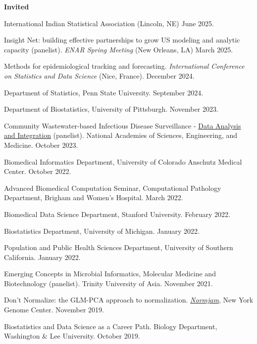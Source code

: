 \documentclass[10pt]{article}
\renewcommand{\section}[2]%
        {\pagebreak[2]\vspace{1.3\baselineskip}%
         \phantomsection\addcontentsline{toc}{section}{#1}%
         \hspace{0in}%
         \marginpar{
         \raggedright \scshape #1}#2}
\begin{document}
\section{Talks}
\textbf{Invited}
\begin{enumerate}[label= {[\arabic*]}]
\item International Indian Statistical Association (Lincoln, NE) June 2025.
\item Insight Net: building effective partnerships to grow US modeling and analytic capacity (panelist). {\it ENAR Spring Meeting} (New Orleans, LA) March 2025.
\item Methods for epidemiological tracking and forecasting. {\it International Conference on Statistics and Data Science} (Nice, France). December 2024. 
\item Department of Statistics, Penn State University. September 2024.
\item Department of Biostatistics, University of Pittsburgh. November 2023.
\item Community Wastewater-based Infectious Disease Surveillance - \href{https://www.nationalacademies.org/event/40901_10-2023_community-wastewater-based-infectious-disease-surveillance-data-analysis-and-integration-open-subgroup-meeting-1}{Data Analysis and Integration} (panelist). National Academies of Sciences, Engineering, and Medicine. October 2023.
\item Biomedical Informatics Department, University of Colorado Anschutz Medical Center. October 2022.
\item Advanced Biomedical Computation Seminar, Computational Pathology Department, Brigham and Women's Hospital. March 2022.
\item Biomedical Data Science Department, Stanford University. February 2022.
\item Biostatistics Department, University of Michigan. January 2022.
\item Population and Public Health Sciences Department, University of Southern California. January 2022.
\item Emerging Concepts in Microbial Informatics, Molecular Medicine and Biotechnology (panelist). Trinity University of Asia. November 2021.
\item Don't Normalize: the GLM-PCA approach to normalization. \href{https://normjam.github.io/}{{\it Normjam}}, New York Genome Center. November 2019.
\item Biostatistics and Data Science as a Career Path. Biology Department, Washington \& Lee University. October 2019.
\end{enumerate}
\end{document}
